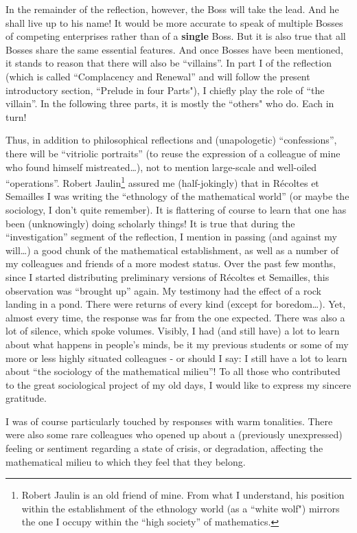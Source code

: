 In the remainder of the reflection, however, the Boss will take the lead. 
And he shall live up to his name! It would be more accurate 
to speak of multiple Bosses of competing enterprises rather than of a \textbf{single}
Boss.
But it is also true that all Bosses share the same essential features.
And once Bosses have been mentioned, it stands to reason that there will also be ``villains''.
In part I of the reflection (which is called ``Complacency and Renewal'' and will follow the present
introductory section, ``Prelude in four Parts"), I chiefly play the role of ``the villain''. In the following
three parts, it is mostly the ``others" who do. 
Each in turn!

Thus, in addition to philosophical reflections and (unapologetic) ``confessions'', 
there will be ``vitriolic portraits'' (to reuse the expression of a colleague of mine who found himself mistreated\ldots), not to mention large-scale and well-oiled ``operations''.
Robert Jaulin\footnote{Robert Jaulin is an old friend of mine. From what I understand, his position within the establishment of the ethnology world (as a ``white wolf") mirrors the one I occupy within the ``high society'' of mathematics.} assured me (half-jokingly) that in 
R\'ecoltes et Semailles I was writing the ``ethnology
of the mathematical world'' (or maybe the sociology, I don't quite remember).
It is flattering of course to learn
that one has been (unknowingly) doing scholarly things!
It is true that during the ``investigation'' segment of the reflection, I mention in passing (and against my will\ldots) a good chunk of the mathematical establishment,
as well as a number of my colleagues and friends of a more modest status.
Over the past few months, since I started distributing preliminary versions of
R\'ecoltes et Semailles, 
this observation was ``brought up'' again. My testimony had the effect of a rock landing in a pond. 
There were returns of every kind (except for boredom\ldots). 
Yet, almost every time, the response was far from the one expected. 
There was also a lot of silence, which spoke volumes. 
Visibly, I had (and still have) a lot to learn about what happens in people's minds, be it
my previous students or some of my more or less highly situated colleagues - or should I say: I still have a lot to learn about ``the sociology of the mathematical milieu''!
To all those who contributed to the great sociological project of my old days, I would like
to express my sincere gratitude.

I was of course particularly touched by responses with warm tonalities. There were also some rare
colleagues who opened up about a (previously unexpressed) feeling or sentiment regarding a state of crisis, or 
degradation, affecting the mathematical milieu to which they feel that they belong. 

